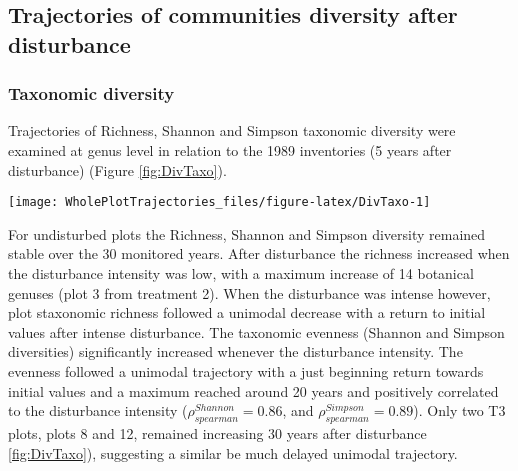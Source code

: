 \documentclass[fleqn,10pt]{ArtEcoFoG} %
\theoremstyle{definition}
\theoremstyle{definition}
\theoremstyle{definition}
\theoremstyle{remark}
\begin{document}
\subsection{Trajectories of communities diversity after
disturbance}\label{trajectories-of-communities-diversity-after-disturbance}

\subsubsection{Taxonomic diversity}\label{taxonomic-diversity}

Trajectories of Richness, Shannon and Simpson taxonomic diversity were
examined at genus level in relation to the 1989 inventories (5 years
after disturbance) (Figure \ref{fig:DivTaxo}).

\begin{figure*}

{\centering \texttt{[image: WholePlotTrajectories\_files/figure-latex/DivTaxo-1]} 

}

\caption{Trajectories of the difference to the 1989 inventories (5 years after disturbance) over 30 years after disturbance of plots communities \textbf{(a)} Richness, \textbf{(b)} Shannon and \textbf{(c)} Simpson diversities. Trajectories correspond to the median (solid line) and 0.025 and 0.975 percentile (gray envelope) observed after 50 iteration of the taxonomic uncertainty propagation. Initial treatments are represented by solid lines colors with green for control, blue for T1,orange for T2 and red for T3.}\label{fig:DivTaxo}
\end{figure*}

For undisturbed plots the Richness, Shannon and Simpson diversity
remained stable over the 30 monitored years. After disturbance the
richness increased when the disturbance intensity was low, with a
maximum increase of 14 botanical genuses (plot 3 from treatment 2). When
the disturbance was intense however, plot staxonomic richness followed a
unimodal decrease with a return to initial values after intense
disturbance. The taxonomic evenness (Shannon and Simpson diversities)
significantly increased whenever the disturbance intensity. The evenness
followed a unimodal trajectory with a just beginning return towards
initial values and a maximum reached around 20 years and positively
correlated to the disturbance intensity
(\(\rho_{spearman}^{Shannon}=0.86\), and
\(\rho_{spearman}^{Simpson}=0.89\)). Only two T3 plots, plots 8 and 12,
remained increasing 30 years after disturbance \ref{fig:DivTaxo}),
suggesting a similar be much delayed unimodal trajectory.
\end{document}
